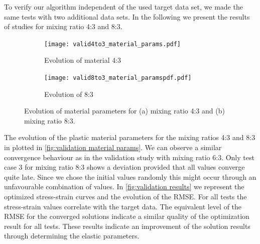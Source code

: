     To verify our algorithm independent of the used target data set, we made the same tests with two additional data sets. In the following we present the results of studies for mixing ratio 4:3 and 8:3. 


    \begin{figure}[H]
    \centering

    \begin{subfigure}[t]{1.0\textwidth}
        \centering
        \texttt{[image: valid4to3\_material\_params.pdf]}
        \caption{Evolution of material 4:3}
        \label{fig:material_params_4to3}
    \end{subfigure}

    \vspace{1em} %

    \begin{subfigure}[t]{1.0\textwidth}
        \centering
        \texttt{[image: valid8to3\_material\_paramspdf.pdf]}
        \caption{Evolution of 8:3}
        \label{fig:material_params_8to3}
    \end{subfigure}

    \caption{Evolution of material parameters for (a) mixing ratio 4:3 and (b) mixing ratio 8:3.}
    \label{fig:validation_material_params}
\end{figure}


    The evolution of the plastic material parameters for the mixing ratios 4:3 and 8:3 in plotted in \autoref{fig:validation material params}. We can observe a similar convergence behaviour as in the validation study with mixing ratio 6:3. Only test case 3 for mixing ratio 8:3 shows a deviation provided that all values converge quite late. Since we chose the initial values randomly this might occur through an unfavourable combination of values. 
    In \autoref{fig:validation results} we represent the optimized stress-strain curves and the evolution of the RMSE. For all tests the stress-strain values correlate with the target data. The equivalent level of the RMSE for the converged solutions indicate a similar quality of the optimization result for all tests. These results indicate an improvement of the solution results through determining the elastic parameters.
     
